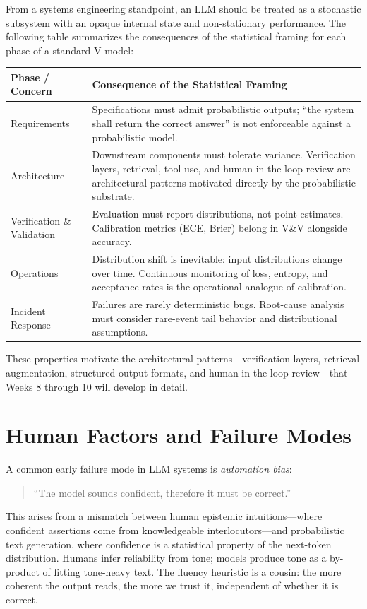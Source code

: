 From a systems engineering standpoint, an LLM should be treated as a stochastic subsystem with an opaque internal state and non-stationary performance. The following table summarizes the consequences of the statistical framing for each phase of a standard V-model:

\begin{center}
\begin{tabular}{|L{3.4cm}|L{8.0cm}|}
\hline
\textbf{Phase / Concern} & \textbf{Consequence of the Statistical Framing} \\
\hline
Requirements & Specifications must admit probabilistic outputs; ``the system shall return the correct answer'' is not enforceable against a probabilistic model. \\
\hline
Architecture & Downstream components must tolerate variance. Verification layers, retrieval, tool use, and human-in-the-loop review are architectural patterns motivated directly by the probabilistic substrate. \\
\hline
Verification \& Validation & Evaluation must report distributions, not point estimates. Calibration metrics (ECE, Brier) belong in V\&V alongside accuracy. \\
\hline
Operations & Distribution shift is inevitable: input distributions change over time. Continuous monitoring of loss, entropy, and acceptance rates is the operational analogue of calibration. \\
\hline
Incident Response & Failures are rarely deterministic bugs. Root-cause analysis must consider rare-event tail behavior and distributional assumptions. \\
\hline
\end{tabular}
\end{center}

These properties motivate the architectural patterns---verification layers, retrieval augmentation, structured output formats, and human-in-the-loop review---that Weeks 8 through 10 will develop in detail.

\section{Human Factors and Failure Modes}

A common early failure mode in LLM systems is \emph{automation bias}:
\begin{quote}
``The model sounds confident, therefore it must be correct.''
\end{quote}
This arises from a mismatch between human epistemic intuitions---where confident assertions come from knowledgeable interlocutors---and probabilistic text generation, where confidence is a statistical property of the next-token distribution. Humans infer reliability from tone; models produce tone as a by-product of fitting tone-heavy text. The fluency heuristic is a cousin: the more coherent the output reads, the more we trust it, independent of whether it is correct.

